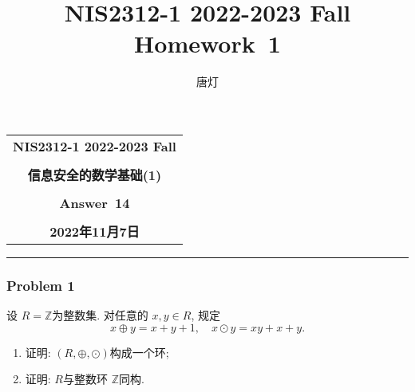 \documentclass[a4paper,12pt]{ctexart}
\title{NIS2312-1 2022-2023 Fall Homework~1}
\author{唐灯}
\newcommand{\Z}{\mathbb{Z}}
\begin{document}
  \begin{center}

  \vspace{-0.3in}
  \begin{tabular}{c}
    \textbf{\Large NIS2312-1 2022-2023 Fall} \\
    \textbf{\Large  } \\
    \textbf{\Large  信息安全的数学基础(1)} \\
    \textbf{\Large  } \\
    \textbf{\Large  Answer~14} \\
    \textbf{\Large  } \\
    \textbf{\Large 2022年11月7日} \\
  \end{tabular}
  \end{center}
  \noindent
  \rule{\linewidth}{0.4pt}
  

\subsubsection*{Problem 1}
    设 $ R=\Z $为整数集. 对任意的 $ x,y\in R $, 规定 
    \[x\oplus y=x+y+1,\quad x\odot y=xy+x+y.\]
    \begin{enumerate}[label=(\arabic{*})]
      \item 证明: $ (R,\oplus,\odot) $构成一个环;
      \item 证明: $ R $与整数环 $ \Z $同构.
    \end{enumerate}
\end{document}
